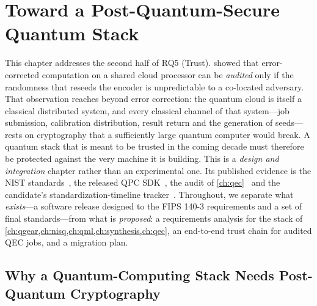 \chapter{Toward a Post-Quantum-Secure Quantum Stack}\label{ch:pqc}


This chapter addresses the second half of RQ5 (Trust).  showed that error-corrected computation on a shared cloud processor can be \emph{audited} only if the randomness that reseeds the encoder is unpredictable to a co-located adversary. That observation reaches beyond error correction: the quantum cloud is itself a classical distributed system, and every classical channel of that system---job submission, calibration distribution, result return and the generation of seeds---rests on cryptography that a sufficiently large quantum computer would break. A quantum stack that is meant to be trusted in the coming decade must therefore be protected against the very machine it is building. This is a \emph{design and integration} chapter rather than an experimental one. Its published evidence is the NIST standards~\cite{nist2024fips203,nist2024fips204,nist2024fips205,nist2019fips1403,nist2015sp80090a}, the released QPC SDK~\cite{guo2026lightriderqpc}, the audit of \cref{ch:qec}~\cite{guo2026qecaudit} and the candidate's standardization-timeline tracker~\cite{guo2026nisttracker}. Throughout, we separate what \emph{exists}---a software release designed to the FIPS 140-3 requirements and a set of final standards---from what is \emph{proposed}: a requirements analysis for the stack of \cref{ch:qgear,ch:nisq,ch:qml,ch:synthesis,ch:qec}, an end-to-end trust chain for audited QEC jobs, and a migration plan.

\section{Why a Quantum-Computing Stack Needs Post-Quantum Cryptography}\label{sec:pqc:why}


